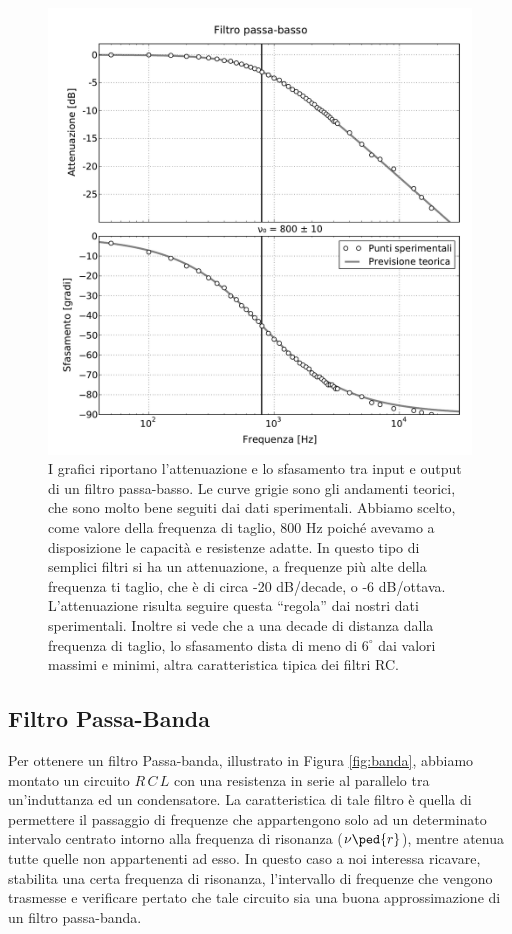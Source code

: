 \begin{figure}
  \includegraphics[scale=0.55]{passa_basso.pdf}
  \caption{I grafici riportano l'attenuazione e lo sfasamento tra input e output di un filtro passa-basso.
    Le curve grigie sono gli andamenti teorici, che sono molto bene seguiti dai dati sperimentali. Abbiamo
    scelto, come valore della frequenza di taglio, 800 Hz poiché avevamo a disposizione le capacità
    e resistenze adatte. In questo tipo di semplici filtri si ha un attenuazione, a frequenze più alte della
    frequenza ti taglio, che è di circa -20 dB/decade, o -6 dB/ottava. L'attenuazione risulta seguire questa
    ``regola'' dai nostri dati sperimentali. Inoltre si vede che a una decade di distanza dalla frequenza di taglio,
    lo sfasamento dista di meno di $6^\circ$ dai valori massimi e minimi, altra caratteristica tipica dei filtri RC.}
  \label{fig:g_basso}
\end{figure}

\subsection*{Filtro Passa-Banda}


Per ottenere un filtro Passa-banda, illustrato in Figura \ref{fig:banda}, abbiamo montato un circuito $R\,C\,L$ con una resistenza in serie al parallelo tra un'induttanza ed un condensatore.
La caratteristica di tale filtro è quella di permettere il passaggio di frequenze che appartengono solo ad un determinato intervalo centrato intorno alla frequenza di risonanza ($\nu\ped{r}$), mentre atenua tutte quelle non appartenenti ad esso.
In questo caso a noi interessa ricavare, stabilita una certa frequenza di risonanza, l'intervallo di frequenze che vengono trasmesse e verificare pertato che tale circuito sia una buona approssimazione di un filtro passa-banda.

